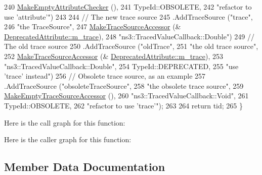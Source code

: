 \begin{DoxyCode}
240                      \hyperlink{group__attribute_ga6a669cb5158dc87450c1874fe84842d3}{MakeEmptyAttributeChecker} (),
241                      TypeId::OBSOLETE,
242                      \textcolor{stringliteral}{"refactor to use 'attribute'"})
243 
244       \textcolor{comment}{// The new trace source}
245       .AddTraceSource (\textcolor{stringliteral}{"trace"},
246                        \textcolor{stringliteral}{"the TraceSource"},
247                        \hyperlink{group__tracing_gab21a770b9855af4e8f69f7531ea4a6b0}{MakeTraceSourceAccessor} (&
      \hyperlink{classDeprecatedAttribute_ac6092d8f46c3ca12f4a535c850a6ef55}{DeprecatedAttribute::m\_trace}),
248                        \textcolor{stringliteral}{"ns3::TracedValueCallback::Double"})
249       \textcolor{comment}{// The old trace source}
250       .AddTraceSource (\textcolor{stringliteral}{"oldTrace"},
251                        \textcolor{stringliteral}{"the old trace source"},
252                        \hyperlink{group__tracing_gab21a770b9855af4e8f69f7531ea4a6b0}{MakeTraceSourceAccessor} (&
      \hyperlink{classDeprecatedAttribute_ac6092d8f46c3ca12f4a535c850a6ef55}{DeprecatedAttribute::m\_trace}),
253                        \textcolor{stringliteral}{"ns3::TracedValueCallback::Double"},
254                        TypeId::DEPRECATED,
255                        \textcolor{stringliteral}{"use 'trace' instead"})
256       \textcolor{comment}{// Obsolete trace source, as an example}
257       .AddTraceSource (\textcolor{stringliteral}{"obsoleteTraceSource"},
258                        \textcolor{stringliteral}{"the obsolete trace source"},
259                        \hyperlink{group__tracing_ga6706efc1edcf2de83784aaa7fb8a9609}{MakeEmptyTraceSourceAccessor} (),
260                        \textcolor{stringliteral}{"ns3::TracedValueCallback::Void"},
261                        TypeId::OBSOLETE,
262                        \textcolor{stringliteral}{"refactor to use 'trace'"});
263     
264     \textcolor{keywordflow}{return} tid;
265   \}
\end{DoxyCode}


Here is the call graph for this function\+:




Here is the caller graph for this function\+:




\subsection{Member Data Documentation}
